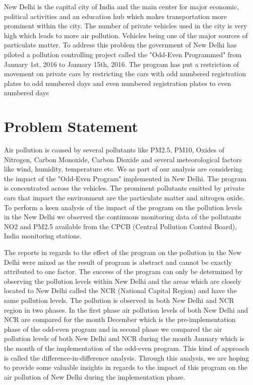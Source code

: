 \documentclass{report}
\begin{document}
New Delhi is the capital city of India and the main center for major economic, political activities and an education hub which makes transportation more prominent within the city. The number of private vehicles used in the city is very high which leads to more air pollution. Vehicles being one of the major sources of particulate matter. To address this problem the government of New Delhi has piloted a pollution controlling project called the "Odd-Even Programmed" from January 1st, 2016 to January 15th, 2016. The program has put a restriction of movement on private cars by restricting the cars with odd numbered registration plates to odd numbered days and even numbered registration plates to even numbered days




\section{Problem Statement}
Air pollution is caused by several pollutants like PM2.5, PM10, Oxides of Nitrogen, Carbon Monoxide, Carbon Dioxide and several meteorological factors like wind, humidity, temperature etc. We as part of our analysis are considering the impact of the "Odd-Even Program" implemented in New Delhi. The program is concentrated across the vehicles. The prominent pollutants emitted by private cars that impact the environment are the particulate matter and nitrogen oxide. To perform a keen analysis of the impact of the program on the pollution levels in the New Delhi we observed the continuous monitoring data of the pollutants NO2 and PM2.5 available from the CPCB (Central Pollution Control Board), India monitoring stations. 

The reports in regards to the effect of the program on the pollution in the New Delhi were mixed as the result of program is abstract and cannot be exactly attributed to one factor. The success of the program can only be determined by observing the pollution levels within New Delhi and the areas which are closely located to New Delhi called the NCR (National Capital Region) and have the same pollution levels. The pollution is observed in both New Delhi and NCR region in two phases. In the first phase air pollution levels of both New Delhi and NCR are compared for the month December which is the pre-implementation phase of the odd-even program and in second phase we compared the air pollution levels of both New Delhi and NCR during the month January which is the month of the implementation of the odd-even program. This kind of approach is called the difference-in-difference analysis.
Through this analysis, we are hoping to provide some valuable insights in regards to the impact of this program on the air pollution of New Delhi during the implementation phase.\cite{CompleteStudyofFactorsContributingtoAirPollution} 
\end{document}
